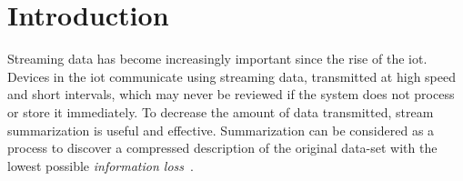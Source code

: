 \section{Introduction}

Streaming data has become increasingly important since the rise of the
\acrlong{iot}. Devices in the \acrshort{iot} communicate using streaming data,
transmitted at high speed and short intervals, which may never be reviewed if
the system does not process or store it immediately. To decrease the amount of
data transmitted, stream summarization is useful and effective. Summarization
can be considered as a process to discover a compressed description of the
original data-set with the lowest possible \emph{information
loss}~\cite{chandola2007summarization}.

